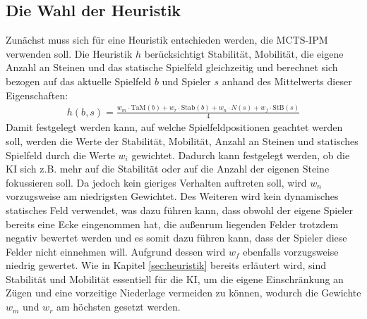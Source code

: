 \documentclass[12pt,a4paper,bibliography=totocnumbered,listof=totocnumbered]{article}
\begin{document}
\subsection{Die Wahl der Heuristik} \label{sec:wahl-heur}
Zunächst muss sich für eine Heuristik entschieden werden, die MCTS-IPM verwenden soll. Die Heuristik $h$ berücksichtigt Stabilität, Mobilität, die eigene Anzahl an Steinen und das statische Spielfeld gleichzeitig und berechnet sich bezogen auf das aktuelle Spielfeld $b$ und Spieler $s$ anhand des Mittelwerts dieser Eigenschaften:
\begin{align}
h(b, s) = \frac{w_{m}\cdot\text{TaM}(b) + w_{r}\cdot\text{Stab}(b) + w_{n}\cdot N(s) + w_{f}\cdot\text{StB}(s)}{4}
\end{align} 
Damit festgelegt werden kann, auf welche Spielfeldpositionen geachtet werden soll, werden die Werte der Stabilität, Mobilität, Anzahl an Steinen und statisches Spielfeld durch die Werte $w_i$ gewichtet. Dadurch kann festgelegt werden, ob die KI sich z.B. mehr auf die Stabilität oder auf die Anzahl der eigenen Steine fokussieren soll. Da jedoch kein gieriges Verhalten auftreten soll, wird $w_n$ vorzugsweise am niedrigsten Gewichtet. Des Weiteren wird kein dynamisches statisches Feld verwendet, was dazu führen kann, dass obwohl der eigene Spieler bereits eine Ecke eingenommen hat, die außenrum liegenden Felder trotzdem negativ bewertet werden und es somit dazu führen kann, dass der Spieler diese Felder nicht einnehmen will. Aufgrund dessen wird $w_{f}$ ebenfalls vorzugsweise niedrig gewertet. Wie in Kapitel \ref{sec:heuristik} bereits erläutert wird, sind Stabilität und Mobilität essentiell für die KI, um die eigene Einschränkung an Zügen und eine vorzeitige Niederlage vermeiden zu können, wodurch die Gewichte $w_{m}$ und $w_{r}$ am höchsten gesetzt werden.\\
\end{document}
